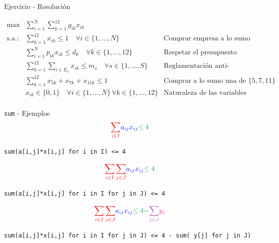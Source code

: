\documentclass[10pt, aspectratio=169]{beamer}
\begin{document}
\begin{frame}{Ejercicio - Resolución}
    \footnotesize
        

    \[\begin{array}{rll}
        \max & \displaystyle \sum_{i=1}^N \sum_{k=1}^{12} g_{ik}x_{ik} &\\
        \text{s.a.:} & \displaystyle \sum_{k=1}^{12} x_{ik}  \leq 1 \quad \forall i\in \{1,\dots, N\} & \text{Comprar empresa a lo sumo una vez} \\
         & \displaystyle \sum_{i=1}^{N} p_{ik}x_{ik}  \leq d_{k} \quad \forall k\in \{1,\dots,12\} & \text{Respetar el presupuesto mensual} \\
         & \displaystyle \sum_{k=1}^{12} \sum_{i\in E_s} x_{ik} \leq m_s \quad \forall s\in \{1,\dots, S\} & \text{Reglamentación anti-monopolio} \\
          & \displaystyle \sum_{k=1}^{12} x_{5k} + x_{7k} + x_{11k} \leq 1 \quad & \text{Comprar a lo sumo una de $\{5,7,11\}$} \\
         & x_{ik}\in\{0,1\} \quad \forall i\in\{1,\dots,N\}\, \forall k\in \{1,\dots,12\} & \text{Naturaleza de las variables}\\
    \end{array}
    \]
    
    
\end{frame}
\fi

\begin{frame}{\texttt{sum} - Ejemplos}
    \centering \small
    \[ {\color{red}\sum_{i\in I}} {\color{blue}a_{ij}x_{ij}} {\color{ForestGreen}\leq 4}\]

    \texttt{\color{red}sum(\color{blue}a[i,j]*x[i,j] \color{red} for i in I) \color{ForestGreen} <= 4}


    \[{\color{red}\sum_{i\in I} \sum_{j\in J}} {\color{blue}a_{ij}x_{ij}} {\color{ForestGreen}\leq 4}\]

    \texttt{\color{red}sum(\color{blue}a[i,j]*x[i,j] \color{red} for i in I for j in J) \color{ForestGreen} <= 4}

    \[ {\color{red}\sum_{i\in I}\sum_{j\in J}} {\color{blue}a_{ij}x_{ij}} {\color{ForestGreen}\leq 4 -}
    {\color{Orchid}\sum_{j\in J}}{\color{Magenta}y_j}\]

    \texttt{\color{red}sum(\color{blue}a[i,j]*x[i,j] \color{red} for i in I for j in J) \color{ForestGreen} <= 4 -
    \color{Orchid} sum(\color{Magenta} y[j] \color{Orchid} for j in J)}


\end{frame}
\end{document}
